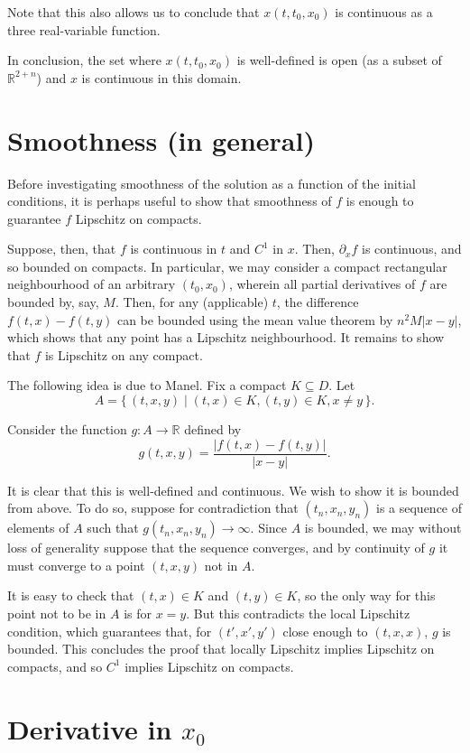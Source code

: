 \documentclass{article}
\newcommand{\R}{\mathbb{R}}
\begin{document}
Note that this also allows us to conclude that $x(t,t_0,x_0)$ is continuous as a three real-variable function.

In conclusion, the set where $x(t,t_0,x_0)$ is well-defined is open (as a subset of $\R^{2+n}$) and $x$ is continuous in this domain.

\section{Smoothness (in general)}

Before investigating smoothness of the solution as a function of the initial conditions, it is perhaps useful to show that smoothness of $f$ is enough to guarantee $f$ Lipschitz on compacts.

Suppose, then, that $f$ is continuous in $t$ and $C^1$ in $x$. Then, $\partial_x f$ is continuous, and so bounded on compacts. In particular, we may consider a compact rectangular neighbourhood of an arbitrary $(t_0, x_0)$, wherein all partial derivatives of $f$ are bounded by, say, $M$. Then, for any (applicable) $t$, the difference $f(t,x) - f(t,y)$ can be bounded using the mean value theorem by $n^2 M \lvert x - y \rvert$, which shows that any point has a Lipschitz neighbourhood. It remains to show that $f$ is Lipschitz on any compact.

The following idea is due to Manel. Fix a compact $K \subseteq D$. Let
\[A = \{\,(t,x,y) \mid (t,x) \in K, (t,y) \in K, x \neq y\,\}.\]

Consider the function $g : A \to \R$ defined by
\[g(t,x,y) = \frac{\lvert f(t,x) - f(t,y) \rvert}{\lvert x-y \rvert}.\]

It is clear that this is well-defined and continuous. We wish to show it is bounded from above. To do so, suppose for contradiction that $(t_n, x_n, y_n)$ is a sequence of elements of $A$ such that $g(t_n, x_n, y_n) \to \infty$. Since $A$ is bounded, we may without loss of generality suppose that the sequence converges, and by continuity of $g$ it must converge to a point $(t,x,y)$ not in $A$.

It is easy to check that $(t,x) \in K$ and $(t,y) \in K$, so the only way for this point not to be in $A$ is for $x = y$. But this contradicts the local Lipschitz condition, which guarantees that, for $(t',x',y')$ close enough to $(t,x,x)$, $g$ is bounded. This concludes the proof that locally Lipschitz implies Lipschitz on compacts, and so $C^1$ implies Lipschitz on compacts.

\section{Derivative in $x_0$}
\end{document}
